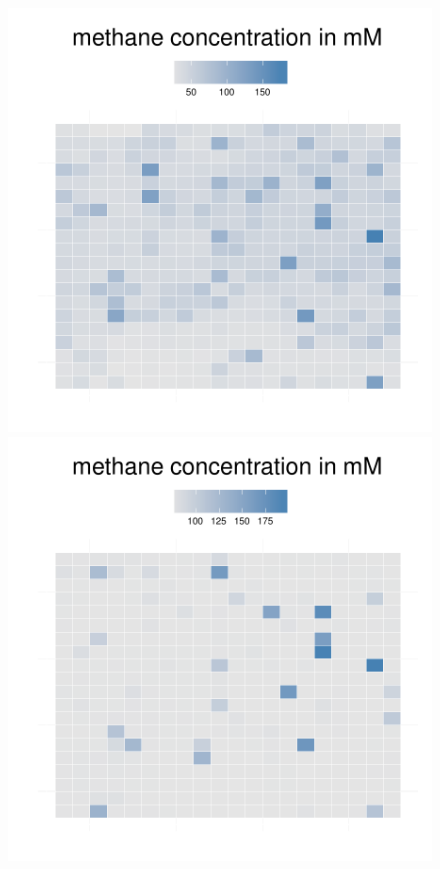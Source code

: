 \begin{figure}[h!]
{\begin{minipage}[t]{0.3\textwidth}
  \end{minipage}
  \begin{minipage}[t]{0.3\textwidth}
    \includegraphics[width=\textwidth]{../results/barkeri_ecoli_20x20_seed4612_meth100.pdf}
  \end{minipage}
  \begin{minipage}[t]{0.3\textwidth}
    \includegraphics[width=\textwidth]{../results/barkeri_ecoli_20x20_seed4612_meth150.pdf}

\end{minipage}}
\end{figure}
